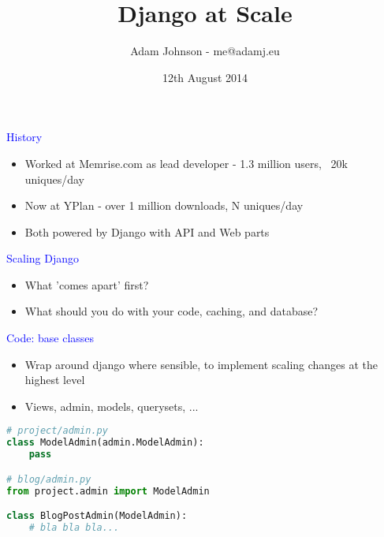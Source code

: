 \documentclass[landscape]{slides}
\title{Django at Scale}
\author{Adam Johnson - me@adamj.eu}
\date{12th August 2014}
\begin{document}
\maketitle


\begin{slide}

    \textcolor{blue}{\Large{History}}

    \begin{itemize}
        \item Worked at Memrise.com as lead developer - 1.3 million users, ~20k uniques/day
        \item Now at YPlan - over 1 million downloads, N uniques/day
        \item Both powered by Django with API and Web parts
    \end{itemize}

\end{slide}





\begin{slide}

    \textcolor{blue}{\Large{Scaling Django}}

    \begin{itemize}
        \item What 'comes apart' first?
        \item What should you do with your code, caching, and database?
    \end{itemize}

\end{slide}




\begin{slide}

    \textcolor{blue}{\Large{Code: base classes}}

    \begin{itemize}
        \item Wrap around django where sensible, to  implement scaling changes at the highest level
        \item Views, admin, models, querysets, ...
    \end{itemize}

    \begin{lstlisting}[language=Python]
# project/admin.py
class ModelAdmin(admin.ModelAdmin):
    pass

# blog/admin.py
from project.admin import ModelAdmin

class BlogPostAdmin(ModelAdmin):
    # bla bla bla...
    \end{lstlisting}

\end{slide}
\end{document}
